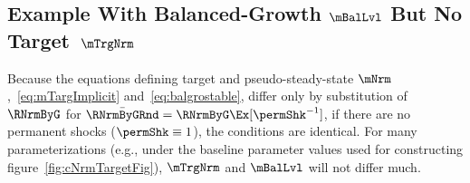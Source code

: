 \documentclass[BufferStockTheory]{subfiles}
\begin{document}
\begin{comment}
  \hypertarget{log-pseudo-steady-state}{}
  \subsubsection{The  expected `log-pseudo steady state'}\label{subsubsec:logpseudosteadystate}

  A final point of stability will be indicated by a $\sim$ accent; this is the $\mNrm$ at which the expectation of $\log \mLvl$ is unchanging.

  \begin{verbatimwrite}{\EqDir/TheoremGroIsStable}
    \begin{theorem}\label{thm:TheoremGroIsStable}{}{\label{thm:TheoremGroIsStable}}
      For the non-degenerate solution to Section~\ref{subsec:Setup}'s problem when {\FVAC}, {\WRIC}, and {\GICRaw} all hold, there exists a unique cash-on-hand-to-permanent-income ratio $\mBalLvl>0$ such that
      \begin{equation}
        \Ex_t [\log {\mLvl}_{t+1} ] = \log \mLvl_t \mbox{~if~} \mLvl_t = \mBalLvl.
        \label{eq:mTarget}
      \end{equation}
      Moreover, $\mBalLvl$ is a point of stability in the sense that
      \begin{equation} \label{eq:stabilityLog}
        \begin{split}
          \forall {\mNrm}_t\in(0,\mBalLvl),      \,\,& \Ex_t [\log {\mLvl}_{t+1}] > \log {\mLvl}_t  \\
          \forall {\mNrm}_t\in(\mBalLvl,\infty), \,\,& \Ex_t [\log {\mLvl}_{t+1}] < \log {\mLvl}_t.
        \end{split}
      \end{equation}
    \end{theorem}
  \end{verbatimwrite}
  

  with two associated Lemmas demonstrating that $\mBalLvl < \mBalLog$ and $\mBalLvl < \$\mTrgNrm$.
\end{comment}


\subsection{Example With Balanced-Growth \texorpdfstring{$\mBalLvl$}{m} But No Target~\texorpdfstring{$\mTrgNrm$}{m}}

Because the equations defining target and pseudo-steady-state $\mNrm$,~\eqref{eq:mTargImplicit} and~\eqref{eq:balgrostable}, differ only by substitution of $\RNrmByG$ for $\bar{\RNrmByGRnd}=\RNrmByG \Ex[\permShk^{-1}]$, if there are no permanent shocks ($\permShk \equiv 1$), the conditions are identical.
For many parameterizations (e.g., under the baseline parameter values used for constructing figure~\ref{fig:cNrmTargetFig}), $\mTrgNrm$ and $\mBalLvl$ will not differ much.
\end{document}
